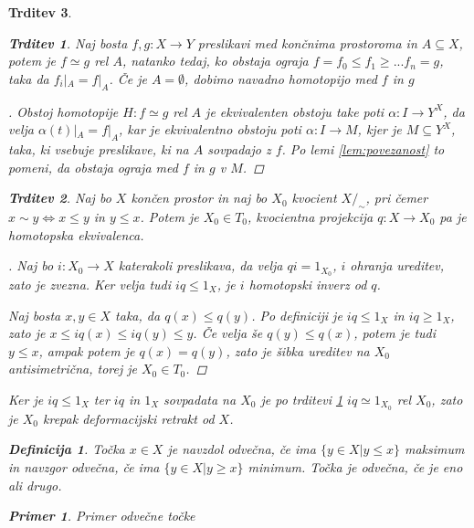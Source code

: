 \documentclass[a4paper,12pt]{article}
\theoremstyle{definition}
\newtheorem{definicija}{Definicija}
\theoremstyle{plain}
\theoremstyle{definition}
\newtheorem{primer}{Primer}
\theoremstyle{plain}
\newtheorem{trditev}{Trditev}
\theoremstyle{plain}
\theoremstyle{plain}
\theoremstyle{plain}
\newenvironment{dokaz}{\begin{proof}[\bfseries\upshape\proofname]}{\end{proof}}
\begin{document}
\begin{trditev}
\begin{trditev}
    \label{iz:ograje}
Naj bosta $f,g: X\rightarrow Y$ preslikavi med končnima prostoroma in $A\subseteq X$, potem je $f\simeq g$ rel $A$, natanko tedaj, ko obstaja ograja $f=f_0\leq f_1\geq ... f_n=g$, taka da $f_i|_A=f|_A$. Če je $A=\emptyset$, dobimo navadno homotopijo med $f$ in $g$
\end{trditev}

\begin{dokaz}
    Obstoj homotopije $H:f\simeq g$ rel $A$ je ekvivalenten obstoju take poti $\alpha: I \rightarrow Y^X$, da velja $\alpha(t)|_A=f|_A$, kar je ekvivalentno obstoju poti 
    $\alpha: I \rightarrow M$, kjer je $M\subseteq Y^X$, taka, ki vsebuje preslikave, ki na $A$ sovpadajo z $f$. Po lemi \ref{lem:povezanost} to pomeni, da obstaja ograja 
    med $f$ in $g$ v $M$.
\end{dokaz}

\begin{trditev}
    Naj bo $X$ končen prostor in naj bo $X_0$ kvocient $X/_\sim$, pri čemer $x\sim y \Leftrightarrow x\le y$ in $y\le x$. Potem je $X_0\in T_0$, kvocientna projekcija $q:X\rightarrow X_0$ pa je homotopska ekvivalenca.
\end{trditev}

\begin{dokaz}
    Naj bo $i:X_0\rightarrow X$ katerakoli preslikava, da velja $qi=1_{X_0}$, $i$ ohranja ureditev, zato je zvezna. Ker velja tudi $iq \leq 1_X$, je $i$ homotopski inverz od $q$.

    Naj bosta $x,y\in X$ taka, da $q(x)\leq q(y)$. Po definiciji je $iq \leq 1_X$ in $iq \geq 1_X$, zato je $x \leq iq(x) \leq iq(y) \leq y$. Če velja še $q(y)\leq q(x)$, potem je tudi $y\leq x$, ampak potem je $q(x)=q(y)$, zato je šibka ureditev na $X_0$ antisimetrična, torej je $X_0\in T_0$.
\end{dokaz}


    Ker je $iq\leq 1_X$ ter $iq$ in $1_X$ sovpadata na $X_0$ je po trditevi \ref{iz:ograje} 
    $iq \simeq 1_{X_0}$ rel $X_0$, zato je $X_0$ krepak deformacijski retrakt od $X$.


\begin{definicija}
    Točka $x \in X$ je \textit{navzdol odvečna}, če ima $\{y\in X | y \le x\}$ maksimum in \textit{navzgor odvečna}, če ima $\{y\in X | y \ge x\}$ minimum. 
    Točka je odvečna, če je eno ali drugo.
\end{definicija}

\begin{primer}
    Primer odvečne točke
\end{primer}


\end{trditev}
\end{document}
